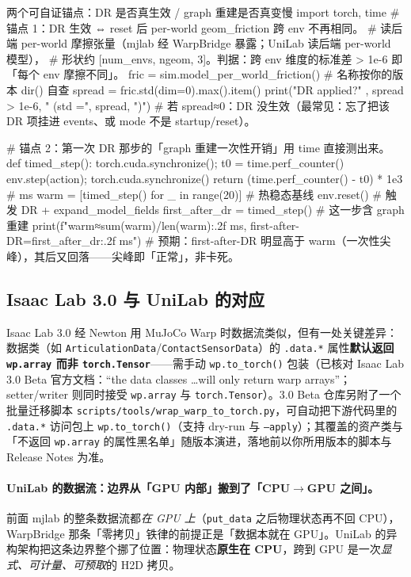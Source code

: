 \begin{codebox}[Python]{两个可自证锚点：DR 是否真生效 / graph 重建是否真变慢}
import torch, time
# 锚点 1：DR 生效 ⇔ reset 后 per-world geom_friction 跨 env 不再相同。
#   读后端 per-world 摩擦张量（mjlab 经 WarpBridge 暴露；UniLab 读后端 per-world 模型），
#   形状约 [num_envs, ngeom, 3]。判据：跨 env 维度的标准差 > 1e-6 即「每个 env 摩擦不同」。
fric = sim.model_per_world_friction()          # 名称按你的版本 dir() 自查
spread = fric.std(dim=0).max().item()
print("DR applied?" , spread > 1e-6, " (std =", spread, ")")
#   若 spread≈0：DR 没生效（最常见：忘了把该 DR 项挂进 events、或 mode 不是 startup/reset）。

# 锚点 2：第一次 DR 那步的「graph 重建一次性开销」用 time 直接测出来。
def timed_step():
    torch.cuda.synchronize(); t0 = time.perf_counter()
    env.step(action); torch.cuda.synchronize()
    return (time.perf_counter() - t0) * 1e3                 # ms
warm = [timed_step() for _ in range(20)]                    # 热稳态基线
env.reset()                                                  # 触发 DR + expand_model_fields
first_after_dr = timed_step()                                # 这一步含 graph 重建
print(f"warm≈{sum(warm)/len(warm):.2f} ms, first-after-DR={first_after_dr:.2f} ms")
#   预期：first-after-DR 明显高于 warm（一次性尖峰），其后又回落——尖峰即「正常」，非卡死。
\end{codebox}

\subsection{Isaac Lab 3.0 与 UniLab 的对应}

Isaac Lab 3.0 经 Newton 用 MuJoCo Warp 时数据流类似，但有一处关键差异：数据类（如 \verb|ArticulationData|/\verb|ContactSensorData|）的 \verb|.data.*| 属性\textbf{默认返回 \texttt{wp.array} 而非 \texttt{torch.Tensor}}——需手动 \verb|wp.to_torch()| 包装（已核对 Isaac Lab 3.0 Beta 官方文档：``the data classes \dots will only return warp arrays''；setter/writer 则同时接受 \texttt{wp.array} 与 \texttt{torch.Tensor}）。3.0 Beta 仓库另附了一个批量迁移脚本 \verb|scripts/tools/wrap_warp_to_torch.py|，可自动把下游代码里的 \verb|.data.*| 访问包上 \verb|wp.to_torch()|（支持 dry-run 与 \texttt{--apply}）；其覆盖的资产类与「不返回 \texttt{wp.array} 的属性黑名单」随版本演进，落地前以你所用版本的脚本与 Release Notes 为准。

\paragraph{UniLab 的数据流：边界从「GPU 内部」搬到了「CPU$\to$GPU 之间」。}前面 mjlab 的整条数据流都\emph{在 GPU 上}（\verb|put_data| 之后物理状态再不回 CPU），WarpBridge 那条「零拷贝」铁律的前提正是「数据本就在 GPU」。UniLab 的异构架构把这条边界整个挪了位置：物理状态\textbf{原生在 CPU}，跨到 GPU 是一次\emph{显式、可计量、可预取}的 H2D 拷贝。

